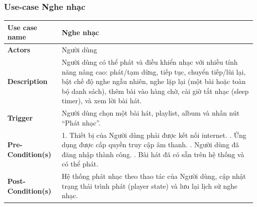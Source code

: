 \documentclass[a4paper]{article}
\begin{document}
\subsubsection{Use-case Nghe nhạc}
\begin{table}[H]
	\centering
	\renewcommand{\arraystretch}{1.3} %
	\begin{tabularx}{\textwidth}{|l|X|}
		\hline
		\textbf{Use case name} & Nghe nhạc                                                                                                                                                                                                                                                                   \\ \hline
		\textbf{Actors}        & Người dùng                                                                                                                                                                                                                                                                  \\ \hline
		\textbf{Description}   & Người dùng có thể phát và điều khiển nhạc với nhiều tính năng nâng cao: phát/tạm dừng, tiếp tục, chuyển tiếp/lùi lại, bật chế độ nghe ngẫu nhiên, nghe lặp lại (một bài hoặc toàn bộ danh sách), thêm bài vào hàng chờ, cài giờ tắt nhạc (sleep timer), và xem lời bài hát. \\ \hline
		\textbf{Trigger}       & Người dùng chọn một bài hát, playlist, album và nhấn nút “Phát nhạc”.                                                                                                                                                                                                       \\ \hline
		\textbf{Pre-Condition(s)}
		                       & 1. Thiết bị của Người dùng phải được kết nối internet. \newline
		2. Ứng dụng được cấp quyền truy cập âm thanh. \newline
		3. Người dùng đã đăng nhập thành công. \newline
		4. Bài hát đã có sẵn trên hệ thống và có thể phát.                                                                                                                                                                                                                                                   \\ \hline
		\textbf{Post-Condition(s)}
		                       & Hệ thống phát nhạc theo thao tác của Người dùng, cập nhật trạng thái trình phát (player state) và lưu lại lịch sử nghe nhạc.                                                                                                                                                \\ \hline

\end{tabularx}
\end{table}
\end{document}
